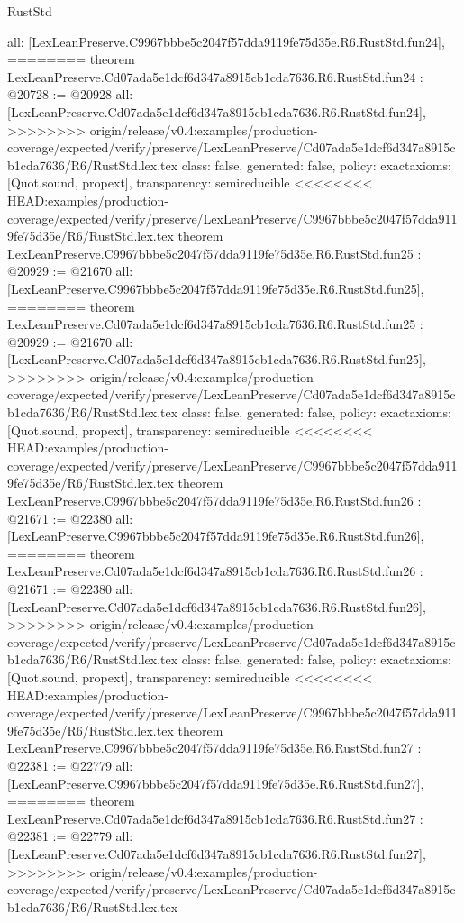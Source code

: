 \begin{lexlean}{RustStd}
\begin{coremodule}
{\begin{coremodule}
{{{{{{{{{{{{{{{{{{{{{{{{{{{  all: [LexLeanPreserve.C9967bbbe5c2047f57dda9119fe75d35e.R6.RustStd.fun24],
========
theorem LexLeanPreserve.Cd07ada5e1dcf6d347a8915cb1cda7636.R6.RustStd.fun24 : @20728 := @20928 {
  all: [LexLeanPreserve.Cd07ada5e1dcf6d347a8915cb1cda7636.R6.RustStd.fun24],
>>>>>>>> origin/release/v0.4:examples/production-coverage/expected/verify/preserve/LexLeanPreserve/Cd07ada5e1dcf6d347a8915cb1cda7636/R6/RustStd.lex.tex
  class: false,
  generated: false,
  policy: exact{axioms: [Quot.sound, propext]},
  transparency: semireducible
}
<<<<<<<< HEAD:examples/production-coverage/expected/verify/preserve/LexLeanPreserve/C9967bbbe5c2047f57dda9119fe75d35e/R6/RustStd.lex.tex
theorem LexLeanPreserve.C9967bbbe5c2047f57dda9119fe75d35e.R6.RustStd.fun25 : @20929 := @21670 {
  all: [LexLeanPreserve.C9967bbbe5c2047f57dda9119fe75d35e.R6.RustStd.fun25],
========
theorem LexLeanPreserve.Cd07ada5e1dcf6d347a8915cb1cda7636.R6.RustStd.fun25 : @20929 := @21670 {
  all: [LexLeanPreserve.Cd07ada5e1dcf6d347a8915cb1cda7636.R6.RustStd.fun25],
>>>>>>>> origin/release/v0.4:examples/production-coverage/expected/verify/preserve/LexLeanPreserve/Cd07ada5e1dcf6d347a8915cb1cda7636/R6/RustStd.lex.tex
  class: false,
  generated: false,
  policy: exact{axioms: [Quot.sound, propext]},
  transparency: semireducible
}
<<<<<<<< HEAD:examples/production-coverage/expected/verify/preserve/LexLeanPreserve/C9967bbbe5c2047f57dda9119fe75d35e/R6/RustStd.lex.tex
theorem LexLeanPreserve.C9967bbbe5c2047f57dda9119fe75d35e.R6.RustStd.fun26 : @21671 := @22380 {
  all: [LexLeanPreserve.C9967bbbe5c2047f57dda9119fe75d35e.R6.RustStd.fun26],
========
theorem LexLeanPreserve.Cd07ada5e1dcf6d347a8915cb1cda7636.R6.RustStd.fun26 : @21671 := @22380 {
  all: [LexLeanPreserve.Cd07ada5e1dcf6d347a8915cb1cda7636.R6.RustStd.fun26],
>>>>>>>> origin/release/v0.4:examples/production-coverage/expected/verify/preserve/LexLeanPreserve/Cd07ada5e1dcf6d347a8915cb1cda7636/R6/RustStd.lex.tex
  class: false,
  generated: false,
  policy: exact{axioms: [Quot.sound, propext]},
  transparency: semireducible
}
<<<<<<<< HEAD:examples/production-coverage/expected/verify/preserve/LexLeanPreserve/C9967bbbe5c2047f57dda9119fe75d35e/R6/RustStd.lex.tex
theorem LexLeanPreserve.C9967bbbe5c2047f57dda9119fe75d35e.R6.RustStd.fun27 : @22381 := @22779 {
  all: [LexLeanPreserve.C9967bbbe5c2047f57dda9119fe75d35e.R6.RustStd.fun27],
========
theorem LexLeanPreserve.Cd07ada5e1dcf6d347a8915cb1cda7636.R6.RustStd.fun27 : @22381 := @22779 {
  all: [LexLeanPreserve.Cd07ada5e1dcf6d347a8915cb1cda7636.R6.RustStd.fun27],
>>>>>>>> origin/release/v0.4:examples/production-coverage/expected/verify/preserve/LexLeanPreserve/Cd07ada5e1dcf6d347a8915cb1cda7636/R6/RustStd.lex.tex
}}}}}}}}}}}}}}}}}}}}}}}}}}}}}}}
\end{coremodule}}
\end{coremodule}
\end{lexlean}
